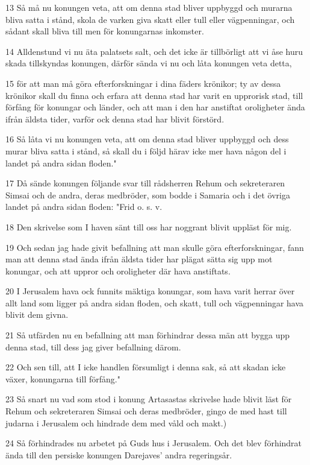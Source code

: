 \par 13 Så må nu konungen veta, att om denna stad bliver uppbyggd och murarna bliva satta i stånd, skola de varken giva skatt eller tull eller vägpenningar, och sådant skall bliva till men för konungarnas inkomster.
\par 14 Alldenstund vi nu äta palatsets salt, och det icke är tillbörligt att vi åse huru skada tillskyndas konungen, därför sända vi nu och låta konungen veta detta,
\par 15 för att man må göra efterforskningar i dina fäders krönikor; ty av dessa krönikor skall du finna och erfara att denna stad har varit en upprorisk stad, till förfång för konungar och länder, och att man i den har anstiftat oroligheter ända ifrån äldsta tider, varför ock denna stad har blivit förstörd.
\par 16 Så låta vi nu konungen veta, att om denna stad bliver uppbyggd och dess murar bliva satta i stånd, så skall du i följd härav icke mer hava någon del i landet på andra sidan floden."
\par 17 Då sände konungen följande svar till rådsherren Rehum och sekreteraren Simsai och de andra, deras medbröder, som bodde i Samaria och i det övriga landet på andra sidan floden: "Frid o. s. v.
\par 18 Den skrivelse som I haven sänt till oss har noggrant blivit uppläst för mig.
\par 19 Och sedan jag hade givit befallning att man skulle göra efterforskningar, fann man att denna stad ända ifrån äldsta tider har plägat sätta sig upp mot konungar, och att uppror och oroligheter där hava anstiftats.
\par 20 I Jerusalem hava ock funnits mäktiga konungar, som hava varit herrar över allt land som ligger på andra sidan floden, och skatt, tull och vägpenningar hava blivit dem givna.
\par 21 Så utfärden nu en befallning att man förhindrar dessa män att bygga upp denna stad, till dess jag giver befallning därom.
\par 22 Och sen till, att I icke handlen försumligt i denna sak, så att skadan icke växer, konungarna till förfång."
\par 23 Så snart nu vad som stod i konung Artasastas skrivelse hade blivit läst för Rehum och sekreteraren Simsai och deras medbröder, gingo de med hast till judarna i Jerusalem och hindrade dem med våld och makt.)
\par 24 Så förhindrades nu arbetet på Guds hus i Jerusalem. Och det blev förhindrat ända till den persiske konungen Darejaves' andra regeringsår.

